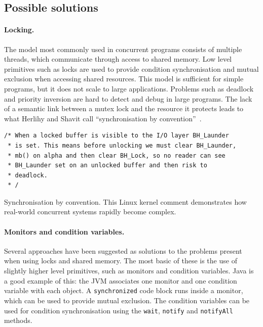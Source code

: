 \documentclass[12pt,a4paper,oneside,openright]{report}
\newcommand{\mycaption}[2]{\caption[#1]{#1 #2}}
\newcommand{\javaKeyword}[1]{\texttt{#1}}
\newcommand{\javaMethod}[1]{\texttt{#1}}
\begin{document}
\subsection{Possible solutions}
\label{sec:possible-solutions}

\paragraph{Locking.} The model most commonly used in concurrent
programs consists of multiple threads, which communicate through
access to shared memory. Low level primitives such as locks are used
to provide condition synchronisation and mutual exclusion when
accessing shared resources. This model is sufficient for simple
programs, but it does not scale to large applications. Problems such
as deadlock and priority inversion are hard to detect and debug in
large programs. The lack of a semantic link between a mutex lock and
the resource it protects leads to what Herlihy and Shavit call
``synchronisation by convention''~\cite[Chapter
18]{ArtMultiprocessorProgramming}.

\begin{Listing}[hbtp]
\begin{lstlisting}
/* When a locked buffer is visible to the I/O layer BH_Launder
 * is set. This means before unlocking we must clear BH_Launder,
 * mb() on alpha and then clear BH_Lock, so no reader can see
 * BH_Launder set on an unlocked buffer and then risk to
 * deadlock.
 * /
\end{lstlisting}

  \mycaption{Synchronisation by convention.}{This Linux kernel comment
    demonstrates how real-world concurrent systems rapidly become
    complex.}
  \label{lst:syncConv}
\end{Listing}

\paragraph{Monitors and condition variables.} Several approaches have
been suggested as solutions to the problems present when using locks
and shared memory. The most basic of these is the use of slightly
higher level primitives, such as monitors and condition
variables. Java is a good example of this: the JVM associates one
monitor and one condition variable with each object. A
\javaKeyword{synchronized} code block runs inside a monitor, which can
be used to provide mutual exclusion. The condition variables can be
used for condition synchronisation using the \javaMethod{wait},
\javaMethod{notify} and \javaMethod{notifyAll} methods.
\end{document}
